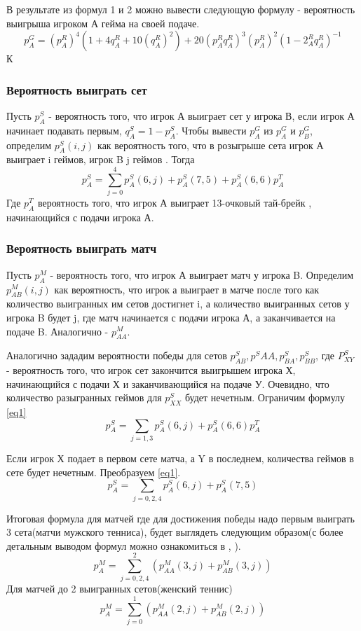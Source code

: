 В результате из формул 1 и 2 можно вывести следующую формулу -  вероятность выигрыша игроком А гейма на своей подаче.
\begin{equation}
p_A^{G} = (p^R_A)^4(1 + 4q^R_A + 10(q^R_A)^2) + 20(p^R_Aq^R_A)^3(p_A^R)^2(1 - 2_A^Rq^R_A)^{-1}
\end{equation} 
К
\subsubsection{Вероятность выиграть сет}
Пусть $p_A^S$ - вероятность того, что игрок А выиграет сет у игрока В, если игрок А начинает подавать первым, $q_A^S=1 - p^S_A$. Чтобы вывести $p^G_A$ из $p^G_A$ и $p^G_B$, определим $p_A^S(i,j)$ как вероятность того, что в розыгрыше сета игрок А выиграет i геймов, игрок B j геймов . Тогда
\begin{equation}
p_A^S=\sum\limits^{4}_{j=0}{p_A^S(6,j)} + p^S_A(7,5) + p^S_A(6,6)p^T_A\label{eq1}
\end{equation}
Где $p^T_A$  вероятность того, что игрок А выиграет 13-очковый тай-брейк , начинающийся с подачи игрока А.
\subsubsection{Вероятность выиграть матч}
Пусть $p^M_A$ - вероятность того, что игрок А выиграет матч у игрока B. Определим $p_{AB}^M(i,j)$ как вероятность, что игрок а выиграет в матче после того как количество выигранных им сетов достигнет i, а количество выигранных сетов у игрока B будет j, где матч начинается с подачи игрока А, а заканчивается на подаче B. Аналогично - $p^M_{AA}$.

Аналогично зададим вероятности победы для сетов $p^S_{AB}, p^S{AA}, p^S_{BA}, p^S_{BB}$, где $P^S_{XY}$ - вероятность того, что игрок сет закончится выигрышем игрока Х, начинающийся с подачи Х и заканчивающийся на подаче У.
Очевидно, что количество разыгранных геймов для $p^S_{XX}$ будет нечетным. Ограничим формулу \eqref{eq1}
\begin{equation}
p_A^S=\sum\limits_{j=1,3}{p_A^S(6,j)}  + p^S_A(6,6)p^T_A
\end{equation}

Если игрок Х подает в первом сете матча, а Y в последнем, количества геймов в сете будет нечетным.
Преобразуем \eqref{eq1}.
\begin{equation}
p_A^S=\sum\limits_{j=0,2,4}{p_A^S(6,j)} + p^S_A(7,5) 
\end{equation}

Итоговая формула для матчей где для достижения победы надо первым выиграть 3 сета(матчи мужского тенниса), будет выглядеть следующим образом(с более детальным выводом формул можно ознакомиться в \cite{Book23}, \cite{Book09}).
\begin{equation}
p_A^M=\sum\limits^{2}_{j=0,2,4}{(p^M_{AA}(3,j) + p^M_{AB}(3,j))} 
\end{equation}
Для матчей до 2 выигранных сетов(женский теннис)
\begin{equation}
p_A^M=\sum\limits^{1}_{j=0}{(p^M_{AA}(2,j) + p^M_{AB}(2,j))} 
\end{equation}
